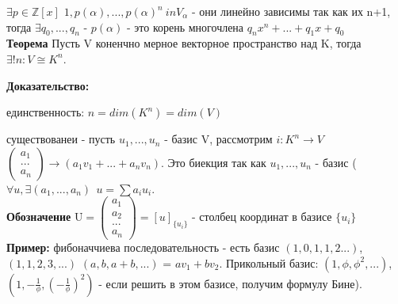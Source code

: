 \documentclass[12pt]{article}
\begin{document}
$\exists p \in \mathbb{Z}[x]$ $1, p(\alpha), ..., p(\alpha)^n \ in V_{\alpha}$ - они линейно зависимы так как их n+1, тогда $\exists q_0, ..., q_n$ - $p(\alpha)$ - это корень многочлена $q_nx^n + ... + q_1x + q_0$
\\

\textbf{Теорема} Пусть V коненчно мерное векторное пространство над K, тогда $\exists !n : V \cong K^n$. 

\textbf{Доказательство:}

единственность: $n = dim(K^n) = dim(V)$ 

существованеи - пусть $u_1, ..., u_n$ - базис V, рассмотрим $i: K^n \rightarrow V$ $\begin{pmatrix}
    a_1 \\
    ... \\
    a_n
\end{pmatrix} \rightarrow (a_1v_1 + ... + a_nv_n)$. Это биекция так как $u_1, ..., u_n$ - базис ($\forall u, \exists (a_1, ..., a_n) \ \ u = \sum a_i u_i$.
\\

\textbf{Обозначение} $\mathrm{U} = \begin{pmatrix}
    a_1 \\
    a_2 \\
    ... \\
    a_n 
\end{pmatrix} = [u]_{\{u_i\}}$ - столбец координат в базисе $\{ u_i \}$
\\

\textbf{Пример:} фибоначчиева последовательность - есть базис $(1, 0, 1, 1, 2 ...)$, $(1, 1, 2, 3, ... )$ $(a, b, a + b, ...)$ = $av_1 + b v_2$. Прикольный базис: $(1, \phi, \phi^2, ...)$, $(1, -\frac{1}{\phi}, (-\frac{1}{\phi})^2)$ - если решить в этом базисе, получим формулу Бине).
\\
\end{document}
